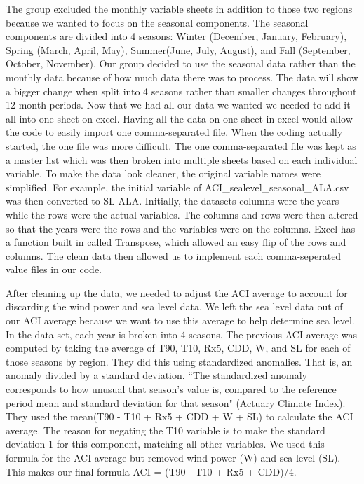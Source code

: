 \documentclass[12pt]{report}
\begin{document}
		\par The group excluded the monthly variable sheets in addition to those two regions because  we wanted to focus on the seasonal components. The seasonal components are divided into 4 seasons: Winter (December, January, February), Spring (March, April, May), Summer(June, July, August), and Fall (September, October, November). Our group decided to use the seasonal data rather than the monthly data because of how much data there was to process. The data will show a bigger change when split into 4 seasons rather than smaller changes throughout 12 month periods. Now that we had all our data we wanted we needed to add it all into one sheet on excel. Having all the data on one sheet in excel would allow the code to easily import one comma-separated file. When the coding actually started, the one file was more difficult. The one comma-separated file was kept as a master list which was then broken into multiple sheets based on each individual variable. To make the data look cleaner, the original variable names were simplified. For example, the initial variable of ACI\_sealevel\_seasonal\_ALA.csv  was then converted to SL ALA. Initially, the datasets columns were the years while the rows were the actual variables. The columns and rows were then altered so that the years were the rows and the variables were on the columns. Excel has a function built in called Transpose, which allowed an easy flip of the rows and columns. The clean data then allowed us to implement each comma-seperated value files in our code.
		\par After cleaning up the data, we needed to adjust the ACI average to account for discarding the wind power and sea level data. We left the sea level data out of our ACI average because we want to use this average to help determine sea level. In the data set, each year is broken into 4 seasons. The previous ACI average was computed by taking the average of T90, T10, Rx5, CDD, W, and SL for each of those seasons by region. They did this using standardized anomalies. That is, an anomaly divided by a standard deviation. \textquotedblleft The standardized anomaly corresponds to how unusual that season's value is, compared to the reference period mean and standard deviation for that season" (Actuary Climate Index). They used the mean(T90 - T10 + Rx5 + CDD + W + SL) to calculate the ACI average. The reason for negating the T10 variable is to make the standard deviation 1 for this component, matching all other variables. We used this formula for the ACI average but removed wind power (W) and sea level (SL). This makes our final formula ACI = (T90 - T10 + Rx5 + CDD)/4.

		
	
\end{document}
